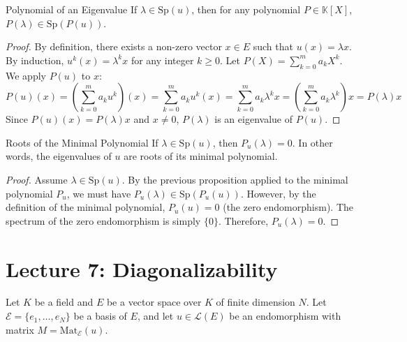 \documentclass[11pt, a4paper]{article}
\begin{document}
\begin{proposition}{Polynomial of an Eigenvalue}{}
If $\lambda \in \text{Sp}(u)$, then for any polynomial $P \in \mathbb{K}[X]$, $P(\lambda) \in \text{Sp}(P(u))$. 
\end{proposition}
\begin{proof}
By definition, there exists a non-zero vector $x \in E$ such that $u(x) = \lambda x$. 
By induction, $u^k(x) = \lambda^k x$ for any integer $k \ge 0$. 
Let $P(X) = \sum_{k=0}^m a_k X^k$. We apply $P(u)$ to $x$:
$$ P(u)(x) = \left(\sum_{k=0}^m a_k u^k\right)(x) = \sum_{k=0}^m a_k u^k(x) = \sum_{k=0}^m a_k \lambda^k x = \left(\sum_{k=0}^m a_k \lambda^k\right) x = P(\lambda)x $$ 
Since $P(u)(x) = P(\lambda)x$ and $x \neq 0$, $P(\lambda)$ is an eigenvalue of $P(u)$. 
\end{proof}

\begin{proposition}{Roots of the Minimal Polynomial}{}
If $\lambda \in \text{Sp}(u)$, then $P_u(\lambda) = 0$. In other words, the eigenvalues of $u$ are roots of its minimal polynomial. 
\end{proposition}
\begin{proof}
Assume $\lambda \in \text{Sp}(u)$. By the previous proposition applied to the minimal polynomial $P_u$, we must have $P_u(\lambda) \in \text{Sp}(P_u(u))$. 
However, by the definition of the minimal polynomial, $P_u(u) = 0$ (the zero endomorphism). 
The spectrum of the zero endomorphism is simply $\{0\}$. 
Therefore, $P_u(\lambda) = 0$. 
\end{proof}

\section{Lecture 7: Diagonalizability}

Let $K$ be a field and $E$ be a vector space over $K$ of finite dimension $N$. 
Let $\mathcal{E} = \{e_1, \dots, e_N\}$ be a basis of $E$, and let $u \in \mathcal{L}(E)$ be an endomorphism with matrix $M = \text{Mat}_{\mathcal{E}}(u)$. 
\end{document}
